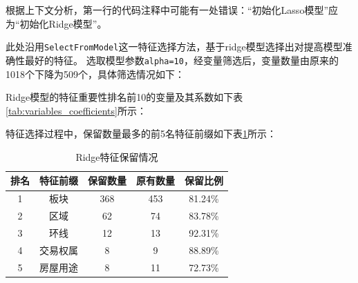 \documentclass[
    report,     %
    oneside,    %
    UTF8,       %
    zihao=-4    %
]{config} %
\begin{document}
根据上下文分析，第一行的代码注释中可能有一处错误：“初始化Lasso模型”应为“初始化Ridge模型”。

此处沿用\lstinline{SelectFromModel}这一特征选择方法，基于ridge模型选择出对提高模型准确性最好的特征。
选取模型参数\lstinline{alpha=10}，经变量筛选后，变量数量由原来的1018个下降为509个，具体筛选情况如下：

Ridge模型的特征重要性排名前10的变量及其系数如下表\ref{tab:variables_coefficients}所示：

\begin{table}[htbp]
    \centering
    \caption{Ridge特征重要性排名前10的变量及其系数}
    \label{tab:variables_coefficients}
\end{table}

特征选择过程中，保留数量最多的前5名特征前缀如下表\ref{tab:feature_retention_ridge}所示：
\begin{table}[htbp]
    \centering
    \caption{Ridge特征保留情况}
    \label{tab:feature_retention_ridge}
    \begin{tabular}{ccccc}
        \toprule
        \textbf{排名} & \textbf{特征前缀} & \textbf{保留数量} & \textbf{原有数量} & \textbf{保留比例} \\
        \midrule
        1 & 板块 & 368 & 453 & 81.24\% \\
        2 & 区域 & 62 & 74 & 83.78\% \\
        3 & 环线 & 12 & 13 & 92.31\% \\
        4 & 交易权属 & 8 & 9 & 88.89\% \\
        5 & 房屋用途 & 8 & 11 & 72.73\% \\
        \bottomrule
    \end{tabular}
\end{table}
\end{document}
